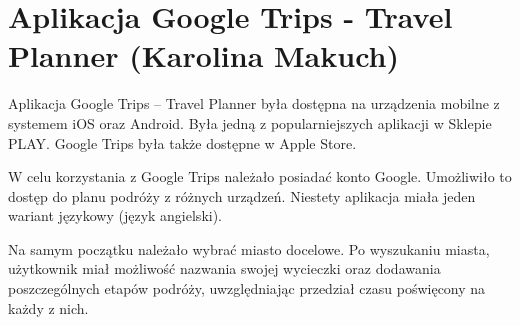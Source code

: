 \documentclass[10pt,twoside,a4paper]{report}
\begin{document}
\section{Aplikacja Google Trips - Travel Planner (Karolina Makuch)}

\par Aplikacja Google Trips – Travel Planner była dostępna na urządzenia mobilne z systemem iOS oraz Android. Była jedną z popularniejszych aplikacji w Sklepie PLAY. Google Trips była także dostępne w Apple Store. 
\par W celu korzystania z Google Trips należało posiadać konto Google. Umożliwiło to dostęp do planu podróży z różnych urządzeń. Niestety aplikacja miała jeden wariant językowy (język angielski).
\par Na samym początku należało wybrać miasto docelowe. Po wyszukaniu miasta, użytkownik miał możliwość nazwania swojej wycieczki oraz dodawania poszczególnych etapów podróży, uwzględniając przedział czasu poświęcony na każdy z nich.
\end{document}
